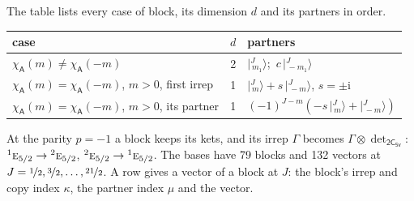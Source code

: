 \documentclass[10pt,a4paper]{article}
\numberwithin{equation}{section}
\newcommand{\grp}[1]{\mathsf{#1}}
\newcommand{\irr}[1]{\text{\normalfont\scshape #1}}
\newcommand{\conjpair}[1]{{}^{#1}}
\newcommand{\iunit}{\mathrm{i}}
\newcommand{\chiA}{\chi_{\grp{A}}}
\newcommand{\irrprod}{\otimes}
\newcommand{\mult}{\kappa}
\newcommand{\intx}{\mu}
\newcommand{\jm}[2]{\bigl\lvert{}^{#1}_{\,#2}\bigr\rangle}
\begin{document}
\leavevmode\label{n:head.case}\label{n:head.partners}The table lists every case of block, its dimension $d$ and its partners in order.
\begin{center}\begin{tabular}{@{}lrl@{}}\toprule
case & $d$ & partners\\\midrule
$\chiA(m) \ne \chiA(-m)$ & 2 & $\jm{J}{m_1}$;\ $c\,\jm{J}{-m_1}$\\
$\chiA(m) = \chiA(-m)$, $m > 0$, first irrep & 1 & $\jm{J}{m} + s\,\jm{J}{-m}$, $s = \pm\iunit$\\
$\chiA(m) = \chiA(-m)$, $m > 0$, its partner & 1 & $(-1)^{J-m}(-s\,\jm{J}{m} + \jm{J}{-m})$\\
\bottomrule\end{tabular}\end{center}
\leavevmode\label{n:operator.determinant.character}At the parity $p = -1$ a block keeps its kets, and its irrep $\Gamma$ becomes $\Gamma \irrprod \det_{\grp{2C_{5v}}}$: $\conjpair{1}\irr{e}_{5/2} \to \conjpair{2}\irr{e}_{5/2}$, $\conjpair{2}\irr{e}_{5/2} \to \conjpair{1}\irr{e}_{5/2}$.
The bases have 79 blocks and 132 vectors at $J = \nicefrac{1}{2}, \nicefrac{3}{2}, \dots, \nicefrac{21}{2}$. \label{n:head.vector}A row gives a vector of a block at $J$: the block's irrep and copy index $\mult$, the partner index $\intx$ and the vector.
\end{document}
